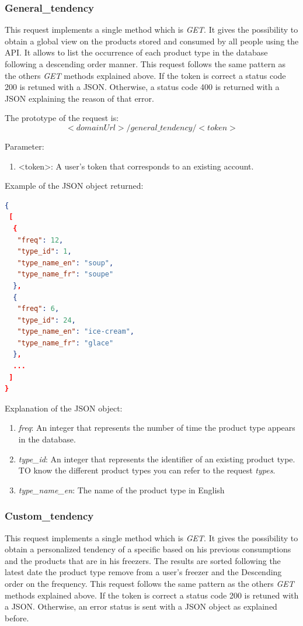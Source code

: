 \subsubsection{General\_tendency}
This request implements a single method which is \textit{GET}. It gives the possibility to obtain a global view on the products stored and consumed by all people using the API. It allows to list the occurrence of each product type in the database following a descending order manner. This request follows the same pattern as the others \textit{GET} methods explained above. If the token is correct a status code 200 is retuned with a JSON. Otherwise, a status code 400 is returned with a JSON explaining the reason of that error.

The prototype of the request is:
$$<domainUrl>/general\_tendency/<token>$$

Parameter:
\begin{enumerate}
\item <token>: A user's token that corresponds to an existing account.
\end{enumerate}

Example of the JSON object returned:
\begin{lstlisting}[language=json]
{
 [
  {
   "freq": 12,
   "type_id": 1,
   "type_name_en": "soup",
   "type_name_fr": "soupe"
  },
  {
   "freq": 6,
   "type_id": 24,
   "type_name_en": "ice-cream",
   "type_name_fr": "glace"
  },
  ...
 ]
}
\end{lstlisting}

Explanation of the  JSON object:
\begin{enumerate}
\item \textit{freq}: An integer that represents the number of time the product type appears in the database.
\item \textit{type\_id}: An integer that represents the identifier of an existing product type. TO know the different product types you can refer to the request \textit{types}.
\item \textit{type\_name\_en}: The name of the product type in English
\end{enumerate}

\subsubsection{Custom\_tendency}
This request implements a single method which is \textit{GET}. It gives the possibility to obtain a personalized tendency of a specific based on his previous consumptions and the products that are in his freezers. The results are sorted following the latest date the product type remove from a user's freezer and the Descending order on the frequency. This request follows the same pattern as the others \textit{GET} methods explained above. If the token is correct a status code 200 is retuned with a JSON. Otherwise, an error status is sent with a JSON object as explained before.\\

